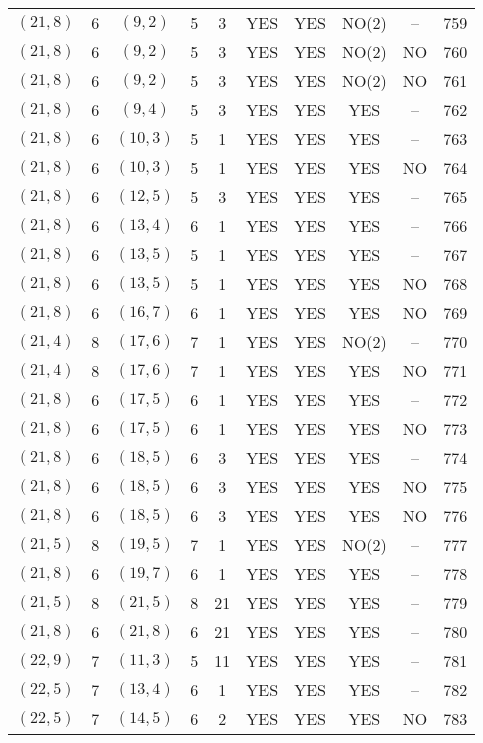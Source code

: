 \begin{longtable}{|c|c|c|c|c|c|c|c|c|c|}
$(21, 8)$ & 6 & $(9, 2)$ & 5 & 3 & YES & YES & NO(2) & -- & 759\\
$(21, 8)$ & 6 & $(9, 2)$ & 5 & 3 & YES & YES & NO(2) & NO & 760\\
$(21, 8)$ & 6 & $(9, 2)$ & 5 & 3 & YES & YES & NO(2) & NO & 761\\
$(21, 8)$ & 6 & $(9, 4)$ & 5 & 3 & YES & YES & YES & -- & 762\\
$(21, 8)$ & 6 & $(10, 3)$ & 5 & 1 & YES & YES & YES & -- & 763\\
$(21, 8)$ & 6 & $(10, 3)$ & 5 & 1 & YES & YES & YES & NO & 764\\
$(21, 8)$ & 6 & $(12, 5)$ & 5 & 3 & YES & YES & YES & -- & 765\\
$(21, 8)$ & 6 & $(13, 4)$ & 6 & 1 & YES & YES & YES & -- & 766\\
$(21, 8)$ & 6 & $(13, 5)$ & 5 & 1 & YES & YES & YES & -- & 767\\
$(21, 8)$ & 6 & $(13, 5)$ & 5 & 1 & YES & YES & YES & NO & 768\\
$(21, 8)$ & 6 & $(16, 7)$ & 6 & 1 & YES & YES & YES & NO & 769\\
$(21, 4)$ & 8 & $(17, 6)$ & 7 & 1 & YES & YES & NO(2) & -- & 770\\
$(21, 4)$ & 8 & $(17, 6)$ & 7 & 1 & YES & YES & YES & NO & 771\\
$(21, 8)$ & 6 & $(17, 5)$ & 6 & 1 & YES & YES & YES & -- & 772\\
$(21, 8)$ & 6 & $(17, 5)$ & 6 & 1 & YES & YES & YES & NO & 773\\
$(21, 8)$ & 6 & $(18, 5)$ & 6 & 3 & YES & YES & YES & -- & 774\\
$(21, 8)$ & 6 & $(18, 5)$ & 6 & 3 & YES & YES & YES & NO & 775\\
$(21, 8)$ & 6 & $(18, 5)$ & 6 & 3 & YES & YES & YES & NO & 776\\
$(21, 5)$ & 8 & $(19, 5)$ & 7 & 1 & YES & YES & NO(2) & -- & 777\\
$(21, 8)$ & 6 & $(19, 7)$ & 6 & 1 & YES & YES & YES & -- & 778\\
$(21, 5)$ & 8 & $(21, 5)$ & 8 & 21 & YES & YES & YES & -- & 779\\
$(21, 8)$ & 6 & $(21, 8)$ & 6 & 21 & YES & YES & YES & -- & 780\\
$(22, 9)$ & 7 & $(11, 3)$ & 5 & 11 & YES & YES & YES & -- & 781\\
$(22, 5)$ & 7 & $(13, 4)$ & 6 & 1 & YES & YES & YES & -- & 782\\
$(22, 5)$ & 7 & $(14, 5)$ & 6 & 2 & YES & YES & YES & NO & 783\\

\end{longtable}
